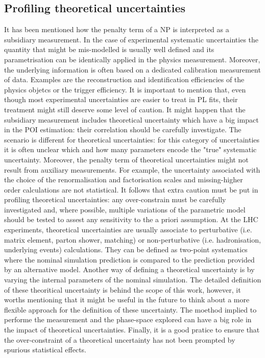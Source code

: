 \documentclass[12pt]{article}
\begin{document}
\subsection{Profiling theoretical uncertainties}
It has been mentioned how the penalty term of a NP is interpreted as a subsidiary measurement. In the case of experimental systematic uncertainties the quantity that might be mis-modelled is usually well defined and its parametrisation can be identically applied in the physics measurement. Moreover, the underlying information is often based on a dedicated calibration measurement of data. Examples are the reconstruction and identification efficiencies of the physics objetcs or the trigger efficiency. It is important to mention that, even though most experimental uncertainties are easier to treat in PL fits, their treatment might still deserve some level of caution. It might happen that the subsidiary measurement includes theoretical uncertainty which have a big impact in the POI estimation: their correlation should be carefully investigate.
The scenario is different for theoretical uncertainties: for this category of uncertainties it is often unclear which and how many parameters encode the "true" systematic uncertainty. Moreover, the penalty term of theoretical uncertainties might not result from auxiliary measurements. For example, the uncertainty associated with the choice of the renormalisation and factorisation scales and missing-higher order calculations are not statistical. It follows that extra caution must be put in profiling theoretical uncertainties: any over-constrain must be carefully investigated and, where possible, multiple variations of the parametric model should be tested to assest any sensitivity to the a priori assumption.
At the LHC experiments, theoretical uncertainties are usually associate to perturbative (i.e. matrix element, parton shower, matching) or non-perturbative (i.e. hadronisation, underlying events) calculations. They can be defined as two-point systematics where the nominal simulation prediction is compared to the prediction provided by an alternative model. Another way of defining a theoretical uncertainty is by varying the internal parameters of the nominal simulation. The detailed definition of these theoritical uncertainty is behind the scope of this work, however, it worths mentioning that it might be useful in the future to think about a more flexible approach for the definition of these uncertainty. The moethod implied to performe the measurement and the phase-space explored can have a big role in the impact of theoretical uncertainties. 
Finally, it is a good pratice to ensure that the over-constraint of a theoretical uncertainty has not been prompted by spurious statistical effects. 
\end{document}
